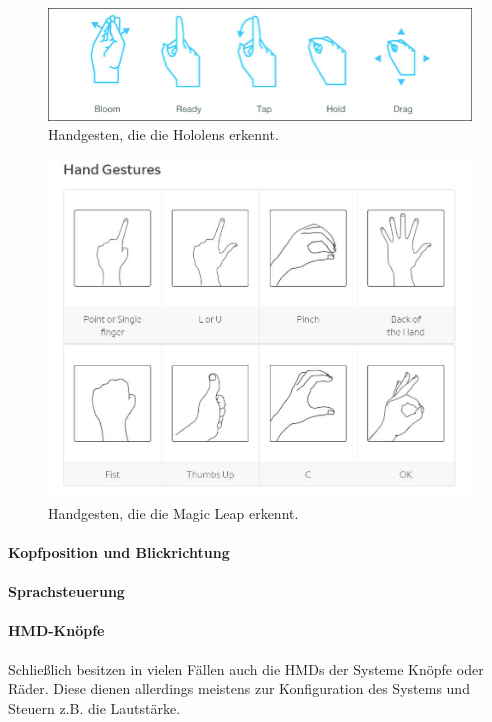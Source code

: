 \begin{figure}
	\centering
	\includegraphics[width=0.7\linewidth]{images/hololensGestures.png}
	\caption{Handgesten, die die Hololens erkennt.}
	\label{img:hololensGestures}
\end{figure}

\begin{figure}
	\centering
	\includegraphics[width=0.7\linewidth]{images/magicleapGestures.jpg}
	\caption{Handgesten, die die Magic Leap erkennt.}
	\label{img:magicGestures}
\end{figure}

\paragraph{Kopfposition und Blickrichtung}

\paragraph{Sprachsteuerung}
\paragraph{HMD-Knöpfe}
Schließlich besitzen in vielen Fällen auch die HMDs der Systeme Knöpfe oder Räder. Diese dienen allerdings meistens zur Konfiguration des Systems und Steuern z.B. die Lautstärke.

